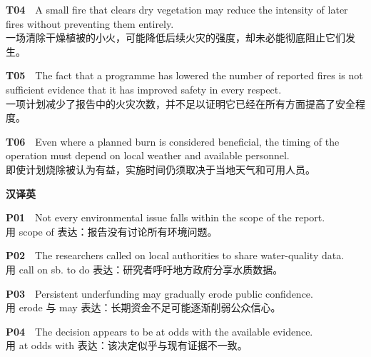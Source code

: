 \documentclass[a4paper,11pt,openany]{report}
\newcommand{\zhline}[1]{{\CJKsf\color{bodygrey}#1}}
\begin{document}
\begin{samepage}
\textbf{T04}　A small fire that clears dry vegetation may reduce the intensity of later fires without preventing them entirely.\\
\zhline{一场清除干燥植被的小火，可能降低后续火灾的强度，却未必能彻底阻止它们发生。}
\par\end{samepage}

\begin{samepage}
\textbf{T05}　The fact that a programme has lowered the number of reported fires is not sufficient evidence that it has improved safety in every respect.\\
\zhline{一项计划减少了报告中的火灾次数，并不足以证明它已经在所有方面提高了安全程度。}
\par\end{samepage}

\begin{samepage}
\textbf{T06}　Even where a planned burn is considered beneficial, the timing of the operation must depend on local weather and available personnel.\\
\zhline{即使计划烧除被认为有益，实施时间仍须取决于当地天气和可用人员。}
\par\end{samepage}

\textbf{汉译英}

\begin{samepage}
\textbf{P01}　Not every environmental issue falls within the scope of the report.\\
\zhline{用 scope of 表达：报告没有讨论所有环境问题。}
\par\end{samepage}

\begin{samepage}
\textbf{P02}　The researchers called on local authorities to share water-quality data.\\
\zhline{用 call on sb. to do 表达：研究者呼吁地方政府分享水质数据。}
\par\end{samepage}

\begin{samepage}
\textbf{P03}　Persistent underfunding may gradually erode public confidence.\\
\zhline{用 erode 与 may 表达：长期资金不足可能逐渐削弱公众信心。}
\par\end{samepage}

\begin{samepage}
\textbf{P04}　The decision appears to be at odds with the available evidence.\\
\zhline{用 at odds with 表达：该决定似乎与现有证据不一致。}
\par\end{samepage}
\end{document}
